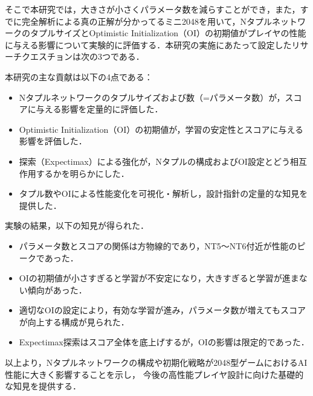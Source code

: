 そこで本研究では，大きさが小さくパラメータ数を減らすことができ，また，すでに完全解析による真の正解が分かってるミニ2048を用いて，NタプルネットワークのタプルサイズとOptimistic Initialization（OI）の初期値がプレイヤの性能に与える影響について実験的に評価する．本研究の実施にあたって設定したリサーチクエスチョンは次の3つである．



\vspace{0.5em}
\noindent 本研究の主な貢献は以下の4点である：
\begin{itemize}
\item Nタプルネットワークのタプルサイズおよび数（=パラメータ数）が，スコアに与える影響を定量的に評価した．
\item Optimistic Initialization（OI）の初期値が，学習の安定性とスコアに与える影響を評価した．
\item 探索（Expectimax）による強化が，Nタプルの構成およびOI設定とどう相互作用するかを明らかにした．
\item タプル数やOIによる性能変化を可視化・解析し，設計指針の定量的な知見を提供した．
\end{itemize}

実験の結果，以下の知見が得られた．
\begin{itemize}
\item パラメータ数とスコアの関係は方物線的であり，NT5～NT6付近が性能のピークであった．
\item OIの初期値が小さすぎると学習が不安定になり，大きすぎると学習が進まない傾向があった．
\item 適切なOIの設定により，有効な学習が進み，パラメータ数が増えてもスコアが向上する構成が見られた．
\item Expectimax探索はスコア全体を底上げするが，OIの影響は限定的であった．
\end{itemize}

以上より，Nタプルネットワークの構成や初期化戦略が2048型ゲームにおけるAI性能に大きく影響することを示し，
今後の高性能プレイヤ設計に向けた基礎的な知見を提供する．